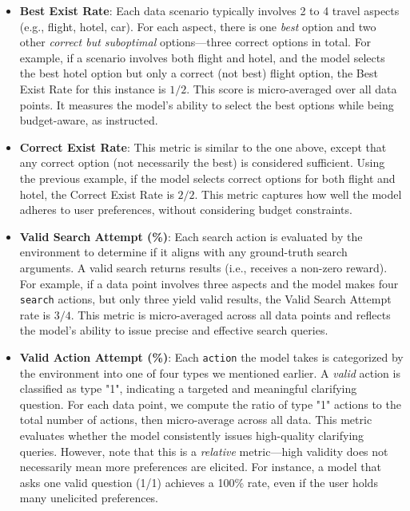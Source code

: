 \begin{itemize}[topsep=2pt, partopsep=-3pt, leftmargin=8pt]

\item \textbf{Best Exist Rate}: Each data scenario typically involves 2 to 4 travel aspects (e.g., flight, hotel, car). For each aspect, there is one \emph{best} option and two other \emph{correct but suboptimal} options—three correct options in total. For example, if a scenario involves both flight and hotel, and the model selects the best hotel option but only a correct (not best) flight option, the Best Exist Rate for this instance is $1/2$. This score is micro-averaged over all data points. It measures the model’s ability to select the best options while being budget-aware, as instructed.

\item \textbf{Correct Exist Rate}: This metric is similar to the one above, except that any correct option (not necessarily the best) is considered sufficient. Using the previous example, if the model selects correct options for both flight and hotel, the Correct Exist Rate is $2/2$. This metric captures how well the model adheres to user preferences, without considering budget constraints.

\item \textbf{Valid Search Attempt (\%)}: Each search action is evaluated by the environment to determine if it aligns with any ground-truth search arguments. A valid search returns results (i.e., receives a non-zero reward). For example, if a data point involves three aspects and the model makes four \texttt{search} actions, but only three yield valid results, the Valid Search Attempt rate is $3/4$. This metric is micro-averaged across all data points and reflects the model's ability to issue precise and effective search queries.

\item \textbf{Valid Action Attempt (\%)}: Each \texttt{action} the model takes is categorized by the environment into one of four types we mentioned earlier. A \emph{valid} action is classified as type "1", indicating a targeted and meaningful clarifying question. For each data point, we compute the ratio of type "1" actions to the total number of actions, then micro-average across all data. This metric evaluates whether the model consistently issues high-quality clarifying queries. However, note that this is a \emph{relative} metric—high validity does not necessarily mean more preferences are elicited. For instance, a model that asks one valid question (1/1) achieves a 100\% rate, even if the user holds many unelicited preferences.


\end{itemize}
